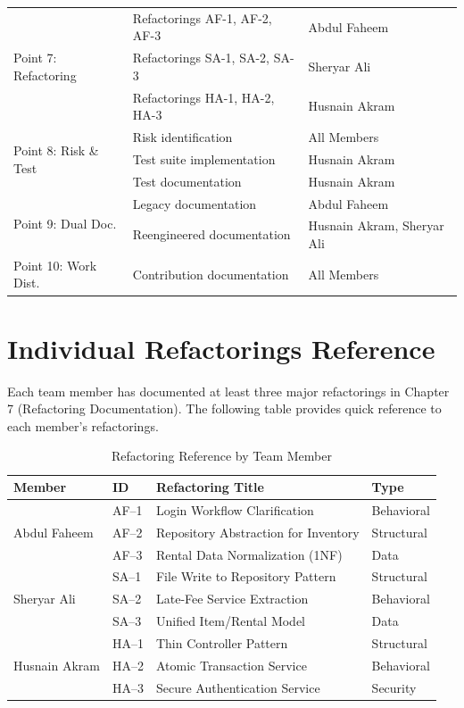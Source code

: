 \begin{table}[h]
\begin{tabular}{p{3.5cm} p{5cm} p{4.5cm}}
    \midrule
    \multirow{3}{*}{Point 7: Refactoring} &
      Refactorings AF-1, AF-2, AF-3 & Abdul Faheem \\
    & Refactorings SA-1, SA-2, SA-3 & Sheryar Ali \\
    & Refactorings HA-1, HA-2, HA-3 & Husnain Akram \\
    \midrule
    \multirow{3}{*}{Point 8: Risk \& Test} &
      Risk identification & All Members \\
    & Test suite implementation & Husnain Akram \\
    & Test documentation & Husnain Akram \\
    \midrule
    \multirow{2}{*}{Point 9: Dual Doc.} &
      Legacy documentation & Abdul Faheem \\
    & Reengineered documentation & Husnain Akram, Sheryar Ali \\
    \midrule
    Point 10: Work Dist. &
      Contribution documentation & All Members \\
    \bottomrule
  \end{tabular}
\end{table}

\section{Individual Refactorings Reference}

Each team member has documented at least three major refactorings in
Chapter 7 (Refactoring Documentation). The following table provides
quick reference to each member's refactorings.

\begin{table}[h]
  \centering
  \caption{Refactoring Reference by Team Member}
  \begin{tabular}{p{3.5cm} p{1.5cm} p{4cm} p{4cm}}
    \toprule
    \textbf{Member} & \textbf{ID} & \textbf{Refactoring Title} & \textbf{Type} \\
    \midrule
    \multirow{3}{*}{Abdul Faheem} &
      AF--1 & Login Workflow Clarification & Behavioral \\
    & AF--2 & Repository Abstraction for Inventory & Structural \\
    & AF--3 & Rental Data Normalization (1NF) & Data \\
    \midrule
    \multirow{3}{*}{Sheryar Ali} &
      SA--1 & File Write to Repository Pattern & Structural \\
    & SA--2 & Late-Fee Service Extraction & Behavioral \\
    & SA--3 & Unified Item/Rental Model & Data \\
    \midrule
    \multirow{3}{*}{Husnain Akram} &
      HA--1 & Thin Controller Pattern & Structural \\
    & HA--2 & Atomic Transaction Service & Behavioral \\
    & HA--3 & Secure Authentication Service & Security \\
    \bottomrule
  \end{tabular}
\end{table}


